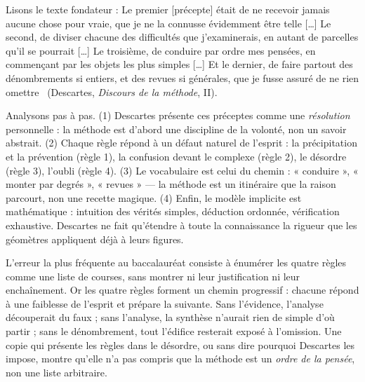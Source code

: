 \documentclass[11pt]{article}
\newcommand{\cle}[1]{{\popxbold\color{popdark}#1}}
\begin{document}
\begin{experience}
Lisons le texte fondateur : \guillemotleft Le premier [précepte] était de ne recevoir jamais aucune chose pour vraie, que je ne la connusse évidemment être telle [\dots] Le second, de diviser chacune des difficultés que j'examinerais, en autant de parcelles qu'il se pourrait [\dots] Le troisième, de conduire par ordre mes pensées, en commençant par les objets les plus simples [\dots] Et le dernier, de faire partout des dénombrements si entiers, et des revues si générales, que je fusse assuré de ne rien omettre \guillemotright\ (Descartes, \emph{Discours de la méthode}, II).
\par
Analysons pas à pas. (1) Descartes présente ces préceptes comme une \emph{résolution} personnelle : la méthode est d'abord une discipline de la volonté, non un savoir abstrait. (2) Chaque règle répond à un défaut naturel de l'esprit : la précipitation et la prévention (règle 1), la confusion devant le complexe (règle 2), le désordre (règle 3), l'oubli (règle 4). (3) Le vocabulaire est celui du chemin : « conduire », « monter par degrés », « revues » — la méthode est un itinéraire que la raison parcourt, non une recette magique. (4) Enfin, le modèle implicite est mathématique : intuition des vérités simples, déduction ordonnée, vérification exhaustive. Descartes ne fait qu'étendre à toute la connaissance la rigueur que les géomètres appliquent déjà à leurs figures.
\end{experience}

\begin{attention}
L'erreur la plus fréquente au baccalauréat consiste à énumérer les quatre règles comme une liste de courses, sans montrer ni leur justification ni leur enchaînement. Or les quatre règles forment un \cle{chemin progressif} : chacune répond à une faiblesse de l'esprit et prépare la suivante. Sans l'évidence, l'analyse découperait du faux ; sans l'analyse, la synthèse n'aurait rien de simple d'où partir ; sans le dénombrement, tout l'édifice resterait exposé à l'omission. Une copie qui présente les règles dans le désordre, ou sans dire pourquoi Descartes les impose, montre qu'elle n'a pas compris que la méthode est un \emph{ordre de la pensée}, non une liste arbitraire.
\end{attention}
\end{document}
